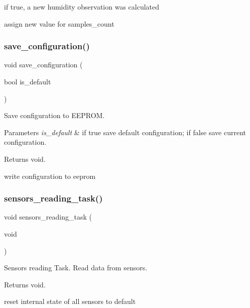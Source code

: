 if true, a new humidity observation was calculated

assign new value for samples\+\_\+count \mbox{\label{i2c-th_8ino_afa979a8cb238fe81bf20654dfd6096ef}} 
\subsubsection{\texorpdfstring{save\+\_\+configuration()}{save\_configuration()}}
{\footnotesize\ttfamily void save\+\_\+configuration (\begin{DoxyParamCaption}\item[{bool}]{is\+\_\+default }\end{DoxyParamCaption})}



Save configuration to E\+E\+P\+R\+OM. 


\begin{DoxyParams}{Parameters}
{\em is\+\_\+default} & if true save default configuration; if false save current configuration. \\
\hline
\end{DoxyParams}
\begin{DoxyReturn}{Returns}
void. 
\end{DoxyReturn}
write configuration to eeprom \mbox{\label{i2c-th_8ino_ad3efe51e17cb8205a24267c2992a12d4}} 
\subsubsection{\texorpdfstring{sensors\+\_\+reading\+\_\+task()}{sensors\_reading\_task()}}
{\footnotesize\ttfamily void sensors\+\_\+reading\+\_\+task (\begin{DoxyParamCaption}\item[{void}]{ }\end{DoxyParamCaption})}



Sensors reading Task. Read data from sensors. 

\begin{DoxyReturn}{Returns}
void. 
\end{DoxyReturn}
reset internal state of all sensors to default


